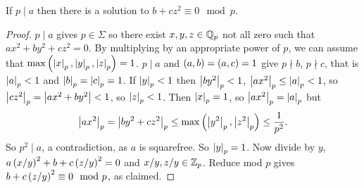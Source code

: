 \pagebreak


\begin{lemma}
If $ p \mid a $ then there is a solution to $ b + cz^2 \equiv 0 \mod p $.
\end{lemma}

\begin{proof}
$ p \mid a $ gives $ p \in \Sigma $ so there exist $ x, y, z \in \mathbb{Q}_p $ not all zero such that $ ax^2 + by^2 + cz^2 = 0 $. By multiplying by an appropriate power of $ p $, we can assume that $ \max\left( \left\lvert x \right\rvert_p, \left\lvert y \right\rvert_p, \left\lvert z \right\rvert_p \right) = 1 $. $ p \mid a $ and $ \left( a, b \right) = \left( a, c \right) = 1 $ give $ p \nmid b $, $ p \nmid c $, that is $ \left\lvert a \right\rvert_p < 1 $ and $ \left\lvert b \right\rvert_p = \left\lvert c \right\rvert_p = 1 $. If $ \left\lvert y \right\rvert_p < 1 $ then $ \left\lvert by^2 \right\rvert_p < 1 $, $ \left\lvert ax^2 \right\rvert_p \le \left\lvert a \right\rvert_p < 1 $, so $ \left\lvert cz^2 \right\rvert_p = \left\lvert ax^2 + by^2 \right\rvert < 1 $, so $ \left\lvert z \right\rvert_p < 1 $. Then $ \left\lvert x \right\rvert_p = 1 $, so $ \left\lvert ax^2 \right\rvert_p = \left\lvert a \right\rvert_p $ but
$$ \left\lvert ax^2 \right\rvert_p = \left\lvert by^2 + cz^2 \right\rvert_p \le \max\left( \left\lvert y^2 \right\rvert_p, \left\lvert z^2 \right\rvert_p \right) \le \dfrac{1}{p^2}. $$
So $ p^2 \mid a $, a contradiction, as $ a $ is squarefree. So $ \left\lvert y \right\rvert_p = 1 $. Now divide by $ y $, $ a\left( x / y \right)^2 + b + c\left( z / y \right)^2 = 0 $ and $ x / y, z / y \in \mathbb{Z}_p $. Reduce mod $ p $ gives $ b + c\left( z / y \right)^2 \equiv 0 \mod p $, as claimed.
\end{proof}

